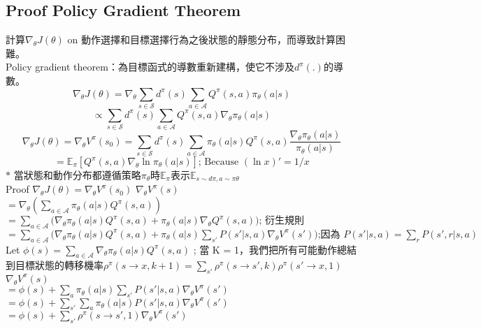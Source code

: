 \subsection{Proof Policy Gradient Theorem}
計算$\nabla_\theta J(\theta)$ on 動作選擇和目標選擇行為之後狀態的靜態分布，而導致計算困難。\\
 Policy gradient theorem：為目標函式的導數重新建構，使它不涉及$d^\pi(.)$的導數。\\
 
$$\nabla_\theta J(\theta) 
= \nabla_\theta \sum_{s \in \mathcal{S}} d^\pi(s) \sum_{a \in \mathcal{A}} Q^\pi(s, a) \pi_\theta(a \vert s) $$
$$\propto \sum_{s \in \mathcal{S}} d^\pi(s) \sum_{a \in \mathcal{A}} Q^\pi(s, a) \nabla_\theta \pi_\theta(a \vert s)$$
$$\nabla_\theta J(\theta)
= \nabla_\theta V^\pi(s_0)= \sum_{s \in \mathcal{S}} d^\pi(s) \sum_{a \in \mathcal{A}} \pi_\theta(a \vert s) Q^\pi(s, a) \frac{\nabla_\theta \pi_\theta(a \vert s)}{\pi_\theta(a \vert s)}$$
$$=\mathbb{E}_\pi [Q^\pi(s, a) \nabla_\theta \ln \pi_\theta(a \vert s)]  {\text{; Because } (\ln x)' = 1/x}$$
$\ast$ 當狀態和動作分布都遵循策略$\pi_{\theta}$時$\mathbb{E}_{\pi}$表示$\mathbb{E}_{s\sim d\pi,a\sim\pi\theta}$\\[5pt]
Proof $\nabla_\theta J(\theta)= \nabla_\theta V^\pi(s_0)$ 
$ \nabla_\theta V^\pi(s) $\\[5pt]
$= \nabla_\theta (\sum_{a \in \mathcal{A}} \pi_\theta(a \vert s)Q^\pi(s, a))$\\[5pt]
$= \sum_{a \in \mathcal{A}} \Big( \nabla_\theta \pi_\theta(a \vert s)Q^\pi(s, a) + \pi_\theta(a \vert s) {\nabla_\theta Q^\pi(s, a)} \Big)  \scriptstyle{\text{; 衍生規則}} $\\
$= \sum_{a \in \mathcal{A}} \Big( \nabla_\theta \pi_\theta(a \vert s)Q^\pi(s, a) + \pi_\theta(a \vert s){\sum_{s'} P(s' \vert s,a) \nabla_\theta V^\pi(s')} \Big)  \scriptstyle{\text{;因為 }  P(s' \vert s, a) = \sum_r P(s', r \vert s, a)}$
Let $\phi(s) = \sum_{a \in \mathcal{A}} \nabla_\theta \pi_\theta(a \vert s)Q^\pi(s, a)$ ; 當
K = 1，我們把所有可能動作總結到目標狀態的轉移機率$\rho^\pi(s \to x, k+1) = \sum_{s'} \rho^\pi(s \to s', k) \rho^\pi(s' \to x, 1)$\\[5pt]
$ {\nabla_\theta V^\pi(s)} $\\[5pt]
$= \phi(s) + \sum_a \pi_\theta(a \vert s) \sum_{s'} P(s' \vert s,a) {\nabla_\theta V^\pi(s')}$ \\[5pt]
$= \phi(s) + \sum_{s'} \sum_a \pi_\theta(a \vert s) P(s' \vert s,a) {\nabla_\theta V^\pi(s')}$ \\[5pt]
$=\phi(s) + \sum_{s'} \rho^\pi(s \to s', 1) {\nabla_\theta V^\pi(s')}$ \\[5pt]
